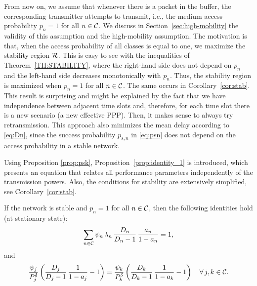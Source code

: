From now on, we assume that whenever there is a packet in the buffer, the corresponding transmitter attempts to transmit, i.e., the medium access probability $p_n=1$ for all $n\in\cal{C}$.
%
We discuss in Section~\ref{sec:high-mobility} the validity of this assumption and the high-mobility assumption. The motivation is that, when the access probability of all classes is equal to one, we maximize the stability region $\cal{R}$.
%
This is easy to see with the inequalities of Theorem~\ref{TH:STABILITY}, where the right-hand side does not depend on $p_n$ and the left-hand side decreases monotonically with $p_n$. Thus, the stability region is maximized when $p_n=1$ for all $n\in\cal{C}$. The same occurs in Corollary~\ref{cor:stab}.
%
This result is surprising and might be explained by the fact that we have independence between adjacent time slots and, therefore, for each time slot there is a new scenario (a new effective PPP).
%
Then, it makes sense to always try retransmission. This approach also minimizes the mean delay according to \eqref{eq:Dn}, since the success probability $p_{s,n}$ in \eqref{eq:psn} does not depend on the access probability in a stable network.

Using Proposition \ref{prop:psk}, Proposition~\ref{prop:identity_1} is introduced, which presents an equation that relates all performance parameters independently of the transmission powers. Also, the conditions for stability are extensively simplified, see Corollary~\ref{cor:stab}.
%
\begin{proposition} \label{prop:identity_1}
	If the network is stable and $p_n=1$ for all ${n\in\cal{C}}$, then the following identities hold (at stationary state):
    \begin{equation}\label{eq:identity_1}
    	\sum_{n\in\cal{C}} \psi_n\,\lambda_n\,\dfrac{D_n}{D_n-1}\,\dfrac{a_n}{1-a_n} = 1,
    \end{equation}
    and
    \begin{equation*}
    	\frac{\psi_j}{P_j^\delta}
        \left( \frac{D_j}{D_j-1}\,\frac{1}{1-a_j} - 1\right) =
        \frac{\psi_k}{P_k^\delta} \left( \frac{D_k}{D_k-1}\,
        \frac{1}{1-a_k} - 1 \right)
        \quad \forall\,j,k\in\cal{C}.
    \end{equation*}
\end{proposition}

